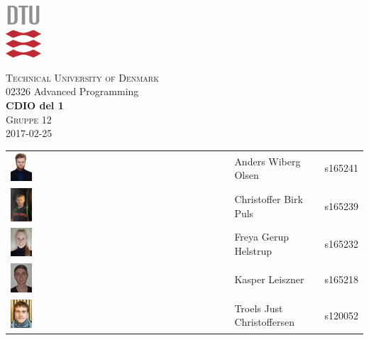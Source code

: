 \begin{titlepage}

\begin{center}
    \includegraphics[width=0.1\textwidth]{images/dtu.pdf}\par\vspace{1cm}

    {\scshape\LARGE Technical University of Denmark\\}
	\vspace{0.5cm}
    02326 Advanced Programming\\
	\vspace{0.8cm}
	{\huge\bfseries CDIO del 1\\}
	{\scshape\Large Gruppe 12\\}
	{\Large 2017-02-25\\}
	
	\vfill

    \begin{tabular}{m{1in} >{\centering\arraybackslash}m{2in} >{\centering\arraybackslash}m{1in}}
        \includegraphics[width=0.1\textwidth]{images/anders.jpg} & Anders Wiberg Olsen & s165241\\
        \includegraphics[width=0.1\textwidth]{images/Christoffer.jpg} & Christoffer Birk Puls & s165239\\
        \includegraphics[width=0.1\textwidth]{images/Freya.jpg} & Freya Gerup Helstrup & s165232\\
        \includegraphics[width=0.1\textwidth]{images/kasper.jpg} & Kasper Leiszner & s165218\\
        \includegraphics[width=0.1\textwidth]{images/troels.jpg} & Troels Just Christoffersen & s120052   \\
    \end{tabular}
    

\end{center}
\end{titlepage}
